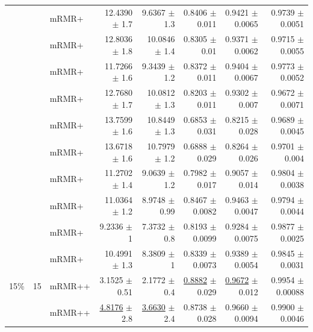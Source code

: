 \begin{longtable}{llp{}rrrrr}
 &  & mRMR+ & 12.4390 {\scriptsize $\pm$ 1.7} & 9.6367 {\scriptsize $\pm$ 1.3} & 0.8406 {\scriptsize $\pm$ 0.011} & 0.9421 {\scriptsize $\pm$ 0.0065} & 0.9739 {\scriptsize $\pm$ 0.0051} \\
 &  & mRMR+ & 12.8036 {\scriptsize $\pm$ 1.8} & 10.0846 {\scriptsize $\pm$ 1.4} & 0.8305 {\scriptsize $\pm$ 0.01} & 0.9371 {\scriptsize $\pm$ 0.0062} & 0.9715 {\scriptsize $\pm$ 0.0055} \\
 &  & mRMR+ & 11.7266 {\scriptsize $\pm$ 1.6} & 9.3439 {\scriptsize $\pm$ 1.2} & 0.8372 {\scriptsize $\pm$ 0.011} & 0.9404 {\scriptsize $\pm$ 0.0067} & 0.9773 {\scriptsize $\pm$ 0.0052} \\
 &  & mRMR+ & 12.7680 {\scriptsize $\pm$ 1.7} & 10.0812 {\scriptsize $\pm$ 1.3} & 0.8203 {\scriptsize $\pm$ 0.011} & 0.9302 {\scriptsize $\pm$ 0.007} & 0.9672 {\scriptsize $\pm$ 0.0071} \\
 &  & mRMR+ & 13.7599 {\scriptsize $\pm$ 1.6} & 10.8449 {\scriptsize $\pm$ 1.3} & 0.6853 {\scriptsize $\pm$ 0.031} & 0.8215 {\scriptsize $\pm$ 0.028} & 0.9689 {\scriptsize $\pm$ 0.0045} \\
 &  & mRMR+ & 13.6718 {\scriptsize $\pm$ 1.6} & 10.7979 {\scriptsize $\pm$ 1.2} & 0.6888 {\scriptsize $\pm$ 0.029} & 0.8264 {\scriptsize $\pm$ 0.026} & 0.9701 {\scriptsize $\pm$ 0.004} \\
 &  & mRMR+ & 11.2702 {\scriptsize $\pm$ 1.4} & 9.0639 {\scriptsize $\pm$ 1.2} & 0.7982 {\scriptsize $\pm$ 0.017} & 0.9057 {\scriptsize $\pm$ 0.014} & 0.9804 {\scriptsize $\pm$ 0.0038} \\
 &  & mRMR+ & 11.0364 {\scriptsize $\pm$ 1.2} & 8.9748 {\scriptsize $\pm$ 0.99} & 0.8467 {\scriptsize $\pm$ 0.0082} & 0.9463 {\scriptsize $\pm$ 0.0047} & 0.9794 {\scriptsize $\pm$ 0.0044} \\
 &  & mRMR+ & 9.2336 {\scriptsize $\pm$ 1} & 7.3732 {\scriptsize $\pm$ 0.8} & 0.8193 {\scriptsize $\pm$ 0.0099} & 0.9284 {\scriptsize $\pm$ 0.0075} & 0.9877 {\scriptsize $\pm$ 0.0025} \\
 &  & mRMR+ & 10.4991 {\scriptsize $\pm$ 1.3} & 8.3809 {\scriptsize $\pm$ 1} & 0.8339 {\scriptsize $\pm$ 0.0073} & 0.9389 {\scriptsize $\pm$ 0.0054} & 0.9845 {\scriptsize $\pm$ 0.0031} \\
\midrule
15\% & 15 & mRMR++ & 3.1525 {\scriptsize $\pm$ 0.51} & 2.1772 {\scriptsize $\pm$ 0.4} & \underline{0.8882} {\scriptsize $\pm$ 0.029} & \underline{0.9672} {\scriptsize $\pm$ 0.012} & 0.9954 {\scriptsize $\pm$ 0.00088} \\
 &  & mRMR++ & \underline{4.8176} {\scriptsize $\pm$ 2.8} & \underline{3.6630} {\scriptsize $\pm$ 2.4} & 0.8738 {\scriptsize $\pm$ 0.028} & 0.9660 {\scriptsize $\pm$ 0.0094} & 0.9900 {\scriptsize $\pm$ 0.0046} \\

\end{longtable}
